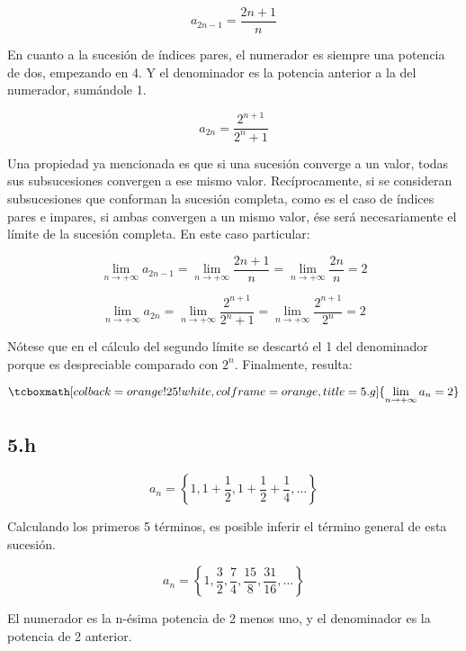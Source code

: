 \documentclass{article}
\newcommand{\hresult}[2]{\tcboxmath[colback=orange!25!white,colframe=orange, title=#1] {#2} }
\newcommand{\subsectionx}[1]{\subsection*{#1}\label{subsec:#1}\addcontentsline{toc}{subsection}{\nameref{subsec:#1}}}
\newcommand{\limninf}{\lim_{n \rightarrow +\infty}}
\begin{document}
\begin{equation}
a_{2n-1} = \frac{2n+1}{n}
\end{equation}

En cuanto a la sucesión de índices pares, el numerador es siempre una potencia de dos, empezando en 4. Y el denominador es la potencia anterior a la del numerador, sumándole 1.

\begin{equation}
a_{2n} = \frac{2^{n+1}}{2^n + 1}
\end{equation}

Una propiedad ya mencionada es que si una sucesión converge a un valor, todas sus subsucesiones convergen a ese mismo valor. Recíprocamente, si se consideran subsucesiones que conforman la sucesión completa, como es el caso de índices pares e impares, si ambas convergen a un mismo valor, ése será necesariamente el límite de la sucesión completa. En este caso particular:

\begin{equation}
\limninf a_{2n-1} = \limninf \frac{2n+1}{n} = \limninf \frac{2n}{n} = 2
\end{equation}

\begin{equation}
\limninf a_{2n} = \limninf \frac{2^{n+1}}{2^n+1} = \limninf \frac{2^{n+1}}{2^n} = 2
\end{equation}

Nótese que en el cálculo del segundo límite se descartó el 1 del denominador porque es despreciable comparado con $ 2^n $. Finalmente, resulta:

\begin{equation}
\hresult{5.g}{\limninf a_n = 2}
\end{equation}

\subsectionx{5.h}

\begin{equation}
a_n = \left\{ 1, 1 + \frac{1}{2}, 1 + \frac{1}{2} + \frac{1}{4}, \dots \right\}
\end{equation}

Calculando los primeros 5 términos, es posible inferir el término general de esta sucesión.

\begin{equation}
a_n = \left\{ 1, \frac{3}{2}, \frac{7}{4}, \frac{15}{8}, \frac{31}{16}, \dots \right\}
\end{equation}

El numerador es la n-ésima potencia de 2 menos uno, y el denominador es la potencia de 2 anterior.
\end{document}
